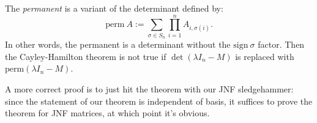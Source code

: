 \begin{remark}
    The \emph{permanent} is a variant of the determinant defined by:
    \[ \mathrm{perm} \ A := \sum_{\sigma \in S_n} \prod_{i = 1}^n A_{i, \sigma(i)}. \]
    In other words, the permanent is a determinant without the $\mathrm{sign} \ \sigma$ factor.  Then the Cayley-Hamilton theorem is not true if $\det(\lambda I_n - M)$ is replaced with $\mathrm{perm}(\lambda I_n - M)$.
\end{remark}

A more correct proof is to just hit the theorem with our JNF sledgehammer: since the statement of our theorem is independent of basis, it suffices to prove the theorem for JNF matrices, at which point it's obvious.


